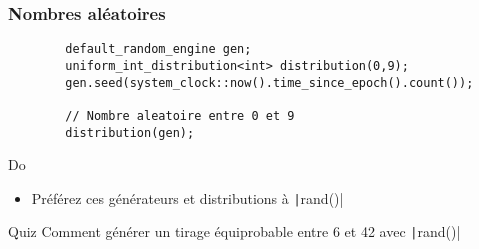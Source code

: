 \documentclass[C++.tex]{subfiles}
\begin{document}
\begin{frame}[fragile]
	\frametitle{Nombres aléatoires}
	\begin{verbatim}
		default_random_engine gen;
		uniform_int_distribution<int> distribution(0,9);
		gen.seed(system_clock::now().time_since_epoch().count());

		// Nombre aleatoire entre 0 et 9
		distribution(gen);
	\end{verbatim}

	\begin{exampleblock}{Do}
		\begin{itemize}
			\item Préférez ces générateurs et distributions à \texttt|rand()|
		\end{itemize}
	\end{exampleblock}

	\begin{block}{Quiz}
		Comment générer un tirage équiprobable entre 6 et 42 avec \texttt|rand()|
	\end{block}

\end{frame}
\end{document}
